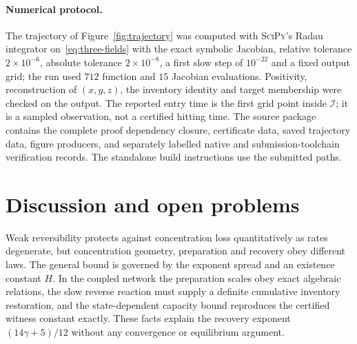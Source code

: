 \documentclass[11pt,a4paper]{article}
\theoremstyle{plain}
\theoremstyle{definition}
\theoremstyle{remark}
\newcommand{\calI}{\mathcal I}
\begin{document}
\paragraph{Numerical protocol.}
The trajectory of Figure~\ref{fig:trajectory} was computed with \textsc{SciPy}'s Radau integrator on~\eqref{eq:three-fields} with the exact symbolic Jacobian, relative tolerance $2\times10^{-6}$, absolute tolerance $2\times10^{-8}$, a first slow step of $10^{-22}$ and a fixed output grid; the run used $712$ function and $15$ Jacobian evaluations. Positivity, reconstruction of $(x,y,z)$, the inventory identity and target membership were checked on the output. The reported entry time is the first grid point inside $\calI$; it is a sampled observation, not a certified hitting time. The source package contains the complete proof dependency closure, certificate data, saved trajectory data, figure producers, and separately labelled native and submission-toolchain verification records. The standalone build instructions use the submitted paths.

\section{Discussion and open problems}
\label{sec:discussion}
Weak reversibility protects against concentration loss quantitatively as rates degenerate, but concentration geometry, preparation and recovery obey different laws. The general bound is governed by the exponent spread and an existence constant $H$. In the coupled network the preparation scales obey exact algebraic relations, the slow reverse reaction must supply a definite cumulative inventory restoration, and the state-dependent capacity bound reproduces the certified witness constant exactly. These facts explain the recovery exponent $(14\gamma+5)/12$ without any convergence or equilibrium argument.
\end{document}
